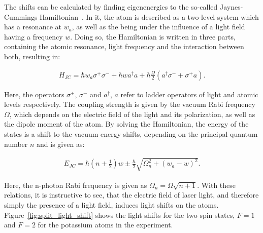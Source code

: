 The shifts can be calculated by finding eigenenergies to the so-called Jaynes-Cummings Hamiltonian~\cite{Fox2006}. In it, the atom is described as a two-level system which has a resonance at $w_a$, as well as the being under the influence of a light field having a frequency $w$. Doing so, the Hamiltonian is written in three parts, containing the atomic resonance, light frequency and the interaction between both, resulting in:

\begin{align}
	H_{JC} = \hbar w_a \sigma^+ \sigma^- + \hbar w a^\dagger a + \hbar \frac{\Omega}{2}\left(a^\dagger \sigma^- + \sigma^+ a\right).
\end{align}

Here, the operators $\sigma^+$, $\sigma^-$ and $a^\dagger$, $a$ refer to ladder operators of light and atomic levels respectively. The coupling strength is given by the vacuum Rabi frequency $\Omega$, which depends on the electric field of the light and its polarization, as well as the dipole moment of the atom.
By solving the Hamiltonian, the energy of the states is a shift to the vacuum energy shifts, depending on the principal quantum number $n$ and is given as:

\begin{align}
	E_{JC} = \hbar \left(n + \frac{1}{2} \right) w \pm \frac{\hbar}{2} \sqrt{\Omega_n^2 + {\left(w_a - w\right)}^2}.
\end{align}

Here, the n-photon Rabi frequency is given as $\Omega_n = \Omega\sqrt{n+1}$. With these relations, it is instructive to see, that the electric field of laser light, and therefore simply the presence of a light field, induces light shifts on the atoms. Figure~\ref{fig:split_light_shift} shows the light shifts for the two spin states, $F=1$ and $F=2$ for the potassium atoms in the experiment.

\begin{figure}[t]%
%
\end{figure}%

